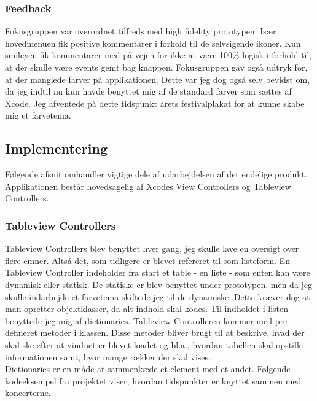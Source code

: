 \documentclass[a4paper,10pt,titlepage]{article}
\begin{document}
\subsubsection{Feedback}
Fokusgruppen var overordnet tilfreds med high fidelity prototypen. Især hovedmenuen fik positive kommentarer i forhold til de selvsigende ikoner. Kun smileyen fik kommentarer med på vejen for ikke at være 100\% logisk i forhold til, at der skulle være events gemt bag knappen. Fokusgruppen gav også udtryk for, at der manglede farver på applikationen. Dette var jeg dog også selv bevidst om, da jeg indtil nu kun havde benyttet mig af de standard farver som sættes af Xcode. Jeg afventede på dette tidspunkt årets festivalplakat for at kunne skabe mig et farvetema.
\subsection{Implementering}
Følgende afsnit omhandler vigtige dele af udarbejdelsen af det endelige produkt. Applikationen består hovedsagelig af Xcodes View Controllers og Tableview Controllers.
\subsubsection{Tableview Controllers}
Tableview Controllers blev benyttet hver gang, jeg skulle lave en oversigt over flere emner. Altså det, som tidligere er blevet refereret til som listeform. En Tableview Controller indeholder fra start et table - en liste - som enten kan være dynamisk eller statisk. De statiske er blev benyttet under prototypen, men da jeg skulle indarbejde et farvetema skiftede jeg til de dynamiske. Dette kræver dog at man opretter objektklasser, da alt indhold skal kodes. Til indholdet i listen benyttede jeg mig af dictionaries. Tableview Controlleren kommer med pre-defineret metoder i klassen. Disse metoder bliver brugt til at beskrive, hvad der skal ske efter at vinduet er blevet loadet og bl.a., hvordan tabellen skal opstille informationen samt, hvor mange rækker der skal vises.\\
Dictionaries er en måde at sammenkæde et element med et andet. Følgende kodeeksempel fra projektet viser, hvordan tidspunkter er knyttet sammen med koncerterne.
\end{document}
